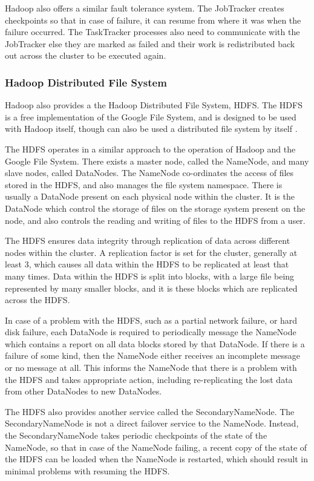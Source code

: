 Hadoop also offers a similar fault tolerance system. The JobTracker creates checkpoints so that in case of failure, it can resume from where it was when the failure occurred. The TaskTracker processes also need to communicate with the JobTracker else they are marked as failed and their work is redistributed back out across the cluster to be executed again.

\subsubsection{Hadoop Distributed File System}
\label{sec:hdfs}
Hadoop also provides a the Hadoop Distributed File System, HDFS. The HDFS is a free implementation of the Google File System, and is designed to be used with Hadoop itself, though can also be used a distributed file system by itself \cite{hdfs}.

The HDFS operates in a similar approach to the operation of Hadoop and the Google File System. There exists a master node, called the NameNode, and many slave nodes, called DataNodes. The NameNode co-ordinates the access of files stored in the HDFS, and also manages the file system namespace. There is usually a DataNode present on each physical node within the cluster. It is the DataNode which control the storage of files on the storage system present on the node, and also controls the reading and writing of files to the HDFS from a user.

The HDFS ensures data integrity through replication of data across different nodes within the cluster. A replication factor is set for the cluster, generally at least 3, which causes all data within the HDFS to be replicated at least that many times. Data within the HDFS is split into blocks, with a large file being represented by many smaller blocks, and it is these blocks which are replicated across the HDFS.

In case of a problem with the HDFS, such as a partial network failure, or hard disk failure, each DataNode is required to periodically message the NameNode which contains a report on all data blocks stored by that DataNode. If there is a failure of some kind, then the NameNode either receives an incomplete message or no message at all. This informs the NameNode that there is a problem with the HDFS and takes appropriate action, including re-replicating the lost data from other DataNodes to new DataNodes.

The HDFS also provides another service called the SecondaryNameNode. The SecondaryNameNode is not a direct failover service to the NameNode. Instead, the SecondaryNameNode takes periodic checkpoints of the state of the NameNode, so that in case of the NameNode failing, a recent copy of the state of the HDFS can be loaded when the NameNode is restarted, which should result in minimal problems with resuming the HDFS.